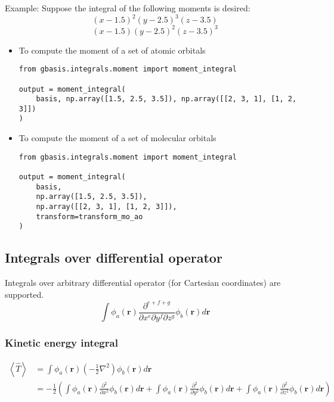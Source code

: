 \documentclass[letterpaper]{article}
\begin{document}
Example:
Suppose the integral of the following moments is desired:
\begin{equation}
  (x - 1.5)^2 (y - 2.5)^3 (z - 3.5)
\end{equation}
\begin{equation}
  (x - 1.5) (y - 2.5)^2 (z - 3.5)^3
\end{equation}
\begin{itemize}
\item To compute the moment of a set of atomic orbitals
  \begin{lstlisting}[xleftmargin=-25pt]
from gbasis.integrals.moment import moment_integral

output = moment_integral(
    basis, np.array([1.5, 2.5, 3.5]), np.array([[2, 3, 1], [1, 2, 3]])
)
\end{lstlisting}
\item To compute the moment of a set of molecular orbitals
  \begin{lstlisting}[xleftmargin=-25pt]
from gbasis.integrals.moment import moment_integral

output = moment_integral(
    basis,
    np.array([1.5, 2.5, 3.5]),
    np.array([[2, 3, 1], [1, 2, 3]]),
    transform=transform_mo_ao
)
\end{lstlisting}
\end{itemize}

\subsection{Integrals over differential operator}
Integrals over arbitrary differential operator (for Cartesian coordinates) are
supported.
\begin{equation}
  \int
  \phi_a(\mathbf{r}) \frac{\partial^{e+f+g}}{\partial x^e \partial y^f \partial z^g} \phi_b(\mathbf{r})
  d\mathbf{r}
\end{equation}

\subsubsection{Kinetic energy integral}
\begin{equation}
  \label{eq:kinetic_energy}
  \begin{split}
    \left< \hat{T} \right>
    &= \int \phi_a(\mathbf{r}) \left( -\frac{1}{2} \nabla^2 \right) \phi_b(\mathbf{r}) d\mathbf{r}\\
    &= -\frac{1}{2}
    \left(
      \int \phi_a(\mathbf{r}) \frac{\partial^2}{\partial x^2} \phi_b(\mathbf{r}) d\mathbf{r}
      + \int \phi_a(\mathbf{r}) \frac{\partial^2}{\partial y^2} \phi_b(\mathbf{r}) d\mathbf{r}
      + \int \phi_a(\mathbf{r}) \frac{\partial^2}{\partial z^2} \phi_b(\mathbf{r}) d\mathbf{r}
    \right)
  \end{split}
\end{equation}
\end{document}
